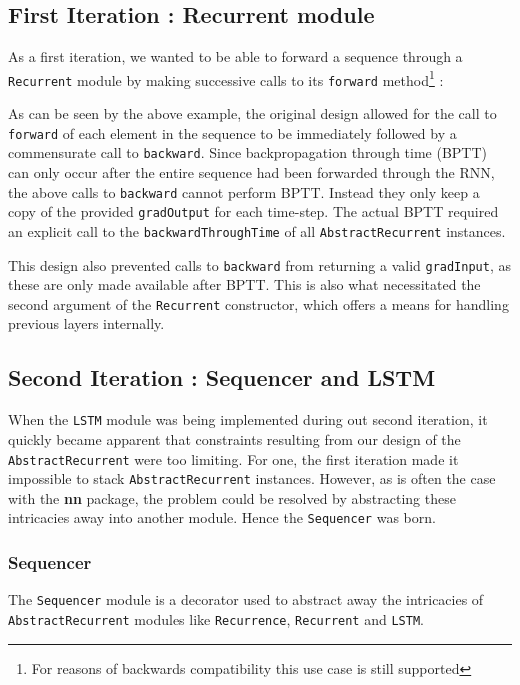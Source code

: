 \documentclass{article} %
\providecommand{\inlinecode}[1]{\texttt{#1}}
\begin{document}
\subsection{First Iteration : Recurrent module}

As a first iteration, we wanted to be able to forward a sequence through a \inlinecode{Recurrent}
module by making successive calls to its \inlinecode{forward} method\footnote{For reasons of backwards 
compatibility this use case is still supported} :



As can be seen by the above example, the original design allowed for 
the call to \inlinecode{forward} of each element in the sequence to 
be immediately followed by a commensurate call to \inlinecode{backward}.
Since backpropagation through time (BPTT)\cite{rumelhart2002learning} can only occur after the entire 
sequence had been forwarded through the RNN, the above calls to \inlinecode{backward}
cannot perform BPTT. Instead they only keep a copy of the provided \inlinecode{gradOutput} for each time-step.
The actual BPTT required an explicit call to the \inlinecode{backwardThroughTime} 
of all \inlinecode{AbstractRecurrent} instances. 

This design also prevented calls to \inlinecode{backward} from
returning a valid \inlinecode{gradInput}, as these are only made available after BPTT.
This is also what necessitated the second argument of the \inlinecode{Recurrent} 
constructor, which offers a means for handling previous layers internally.

\subsection{Second Iteration : Sequencer and LSTM}

When the \inlinecode{LSTM} module was being implemented during out second iteration, 
it quickly became apparent that constraints resulting 
from our design of the \inlinecode{AbstractRecurrent} were too limiting.
For one, the first iteration made it impossible to stack \inlinecode{AbstractRecurrent} instances.
However, as is often the case with the \textbf{nn} package, the problem 
could be resolved by abstracting these intricacies away into another module.
Hence the \inlinecode{Sequencer} was born.

\subsubsection{Sequencer}
The \inlinecode{Sequencer} module is a decorator used to abstract 
away the intricacies of \inlinecode{AbstractRecurrent} modules
like \inlinecode{Recurrence}, \inlinecode{Recurrent} and \inlinecode{LSTM}. 
\end{document}
